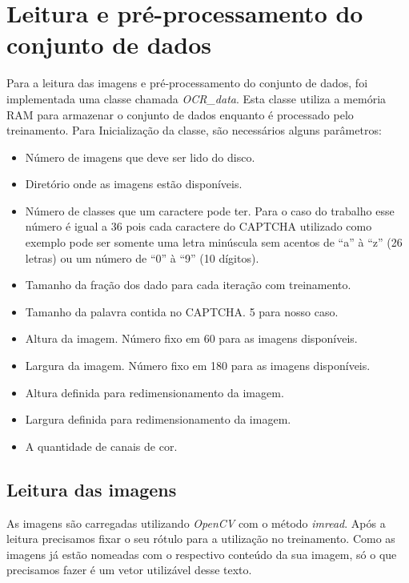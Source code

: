 \section{Leitura e pré-processamento do conjunto de dados}

Para a leitura das imagens e pré-processamento do conjunto de dados, foi
implementada uma classe chamada \textit{OCR\_data}. Esta classe utiliza
a memória RAM para armazenar o conjunto de dados enquanto é processado
pelo treinamento. Para Inicialização da classe, são necessários alguns
parâmetros:

\begin{itemize}

  \item Número de imagens que deve ser lido do disco.
  \item Diretório onde as imagens estão disponíveis.
  \item Número de classes que um caractere pode ter. Para o caso do
    trabalho esse número é igual a 36 pois cada caractere do CAPTCHA
    utilizado como exemplo pode ser somente uma letra minúscula sem
    acentos de ``a'' à ``z'' (26 letras) ou um número de ``0'' à ``9''
    (10 dígitos).
  \item Tamanho da fração dos dado para cada iteração com treinamento.
  \item Tamanho da palavra contida no CAPTCHA. 5 para nosso caso.
  \item Altura da imagem. Número fixo em 60 para as imagens disponíveis.
  \item Largura da imagem. Número fixo em 180 para as imagens
    disponíveis.
  \item Altura definida para redimensionamento da imagem.
  \item Largura definida para redimensionamento da imagem.
  \item A quantidade de canais de cor.

\end{itemize}

\subsection{Leitura das imagens}

As imagens são carregadas utilizando \textit{OpenCV}\cite{OpenCV} com
o método \textit{imread}. Após a leitura precisamos fixar o seu rótulo
para a utilização no treinamento. Como as imagens já estão nomeadas
com o respectivo conteúdo da sua imagem, só o que precisamos fazer é
um vetor utilizável desse texto. 

